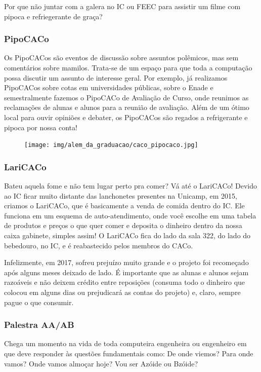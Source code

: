 Por que não juntar com a galera no IC ou FEEC para assistir um filme com pipoca
e refriegerante de graça?

\subsubsection{PipoCACo}

Os PipoCACos são eventos de discussão sobre assuntos polêmicos, mas sem
comentários sobre mamilos. Trata-se de um espaço para que toda a computação
possa discutir um assunto de interesse geral. Por exemplo, já realizamos
PipoCACos sobre cotas em universidades públicas, sobre o Enade e semestralmente
fazemos o PipoCACo de Avaliação de Curso, onde reunimos as reclamações de
alunas e alunos para a reunião de avaliação. Além de um ótimo local para ouvir
opiniões e debater, os PipoCACos são regados a refrigerante e pipoca por nossa
conta!

\begin{figure}[H]
  \centering
  \texttt{[image: img/alem\_da\_graduacao/caco\_pipocaco.jpg]}
\end{figure}

\subsubsection{LariCACo}

Bateu aquela fome e não tem lugar perto pra comer? Vá até o LariCACo! Devido ao
IC ficar muito distante das lanchonetes presentes na Unicamp, em 2015, criamos
o LariCACo, que é basicamente a venda de comida dentro do IC. Ele funciona em
um esquema de auto-atendimento, onde você escolhe em uma tabela de produtos e
preços o que quer comer e deposita o dinheiro dentro da nossa caixa gabinete,
simples assim! O LariCACo fica do lado da sala 322, do lado do bebedouro, no 
IC, e é reabastecido pelos membros do CACo.

Infelizmente, em 2017, sofreu prejuízo muito grande e o projeto foi recomeçado
após alguns meses deixado de lado. É importante que as alunas e alunos sejam
razoáveis e não deixem crédito entre reposições (consuma todo o dinheiro que
colocou em alguns dias ou prejudicará as contas do projeto) e, claro, sempre
pague o que consumir.

\subsubsection{Palestra AA/AB}

Chega um momento na vida de toda computeira engenheira ou engenheiro em que
deve responder às questões fundamentais como: De onde viemos? Para onde vamos?
Onde vamos almoçar hoje? Vou ser Azóide ou Bzóide?

